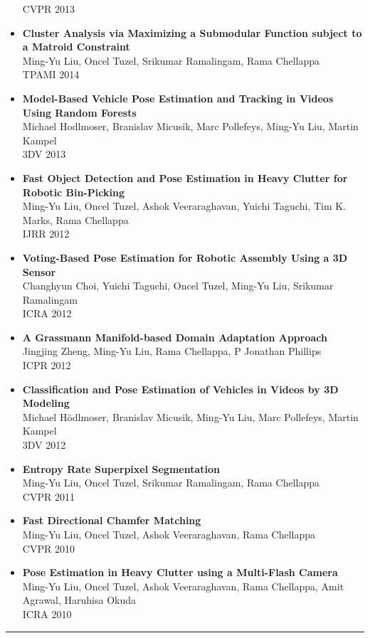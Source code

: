 \documentclass[10pt,letterpaper]{article}
\begin{document}
\begin{itemize}
CVPR 2013\vspace{-2mm}
\item {\bf Cluster Analysis via Maximizing a Submodular Function subject to a Matroid Constraint}\\
      Ming-Yu Liu, Oncel Tuzel, Srikumar Ramalingam, Rama Chellappa\\ TPAMI 2014\vspace{-2mm}
\item {\bf Model-Based Vehicle Pose Estimation and Tracking in Videos Using Random Forests}\\
      Michael Hodlmoser, Branislav Micusik, Marc Pollefeys, Ming-Yu Liu, Martin Kampel\\ 3DV 2013\vspace{-2mm}
\item {\bf Fast Object Detection and Pose Estimation in Heavy Clutter for Robotic Bin-Picking}\\      
			Ming-Yu Liu, Oncel Tuzel, Ashok Veeraraghavan, Yuichi Taguchi, Tim K. Marks, Rama Chellappa\\ IJRR 2012\vspace{-2mm}
\item {\bf Voting-Based Pose Estimation for Robotic Assembly Using a 3D Sensor}\\
      Changhyun Choi, Yuichi Taguchi, Oncel Tuzel, Ming-Yu Liu, Srikumar Ramalingam\\ ICRA 2012\vspace{-2mm}
\item {\bf A Grassmann Manifold-based Domain Adaptation Approach}\\
			Jingjing Zheng, Ming-Yu Liu, Rama Chellappa, P Jonathan Phillips\\ ICPR 2012\vspace{-2mm}
\item {\bf Classification and Pose Estimation of Vehicles in Videos by 3D Modeling}\\%
      Michael Hödlmoser, Branislav Micusik, Ming-Yu Liu, Marc Pollefeys, Martin Kampel\\ 3DV 2012\vspace{-2mm}
\item {\bf Entropy Rate Superpixel Segmentation}\\                
			Ming-Yu Liu, Oncel Tuzel, Srikumar Ramalingam, Rama Chellappa\\ CVPR 2011\vspace{-2mm}
\item {\bf Fast Directional Chamfer Matching}\\                
			Ming-Yu Liu, Oncel Tuzel, Ashok Veeraraghavan, Rama Chellappa\\ CVPR 2010\vspace{-2mm}
\item {\bf Pose Estimation in Heavy Clutter using a Multi-Flash Camera}\\
      Ming-Yu Liu, Oncel Tuzel, Ashok Veeraraghavan, Rama Chellappa, Amit Agrawal, Haruhisa Okuda\\ ICRA 2010\vspace{-2mm}
\end{itemize}
\hrule
\vspace{-0.4em}
\end{document}
